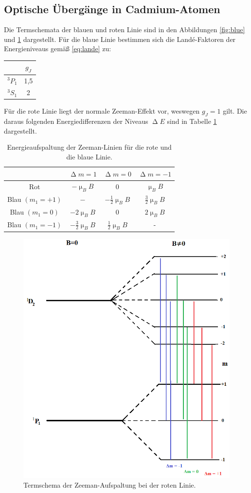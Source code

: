\subsection{Optische Übergänge in Cadmium-Atomen}
Die Termschemata der blauen und roten Linie sind in den Abbildungen \ref{fig:blue} und \ref{fig:red} dargestellt. Für die blaue Linie bestimmen sich die Landé-Faktoren der Energieniveaus gemäß \eqref{eq:lande} zu:
\begin{table}[H]
\centering
\begin{tabular}{c|c}
 & $g_J$\\
 \hline
$^3P_1$  & 1{,}5 \\
$^3S_1$&2
\end{tabular}
\end{table}
Für die rote Linie liegt der normale Zeeman-Effekt vor, weswegen $g_J=1$ gilt. Die daraus folgenden Energiedifferenzen der Niveaus $\upDelta E$ sind in Tabelle \ref{tab:ediff} dargestellt.
\begin{table}[]
\centering
\begin{tabular}{c|ccc}
 &$\upDelta m = 1$&$\upDelta m=0$&$\upDelta m = -1$ \\
 \hline
Rot&$-\upmu_BB$&$0$&$\upmu_BB$\\
Blau $(m_1=+1)$&$-$&$-\frac{1}{2}\upmu_BB$&$\frac{3}{2}\upmu_BB$\\
Blau $(m_1=0)$&$-2\upmu_BB$&$0$&$2\upmu_BB$\\
Blau $(m_1=-1)$&$-\frac{3}{2}\upmu_BB$&$\frac{1}{2}\upmu_BB$&-
\end{tabular}
\caption{Energieaufspaltung der Zeeman-Linien für die rote und die blaue Linie.}
\label{tab:ediff}
\end{table}
\begin{figure}
  \centering
  \includegraphics[scale=0.4]{Bilder/1Termschema.png}
  \caption{Termschema der Zeeman-Aufspaltung bei der roten Linie.}
  \label{fig:red}
\end{figure}
